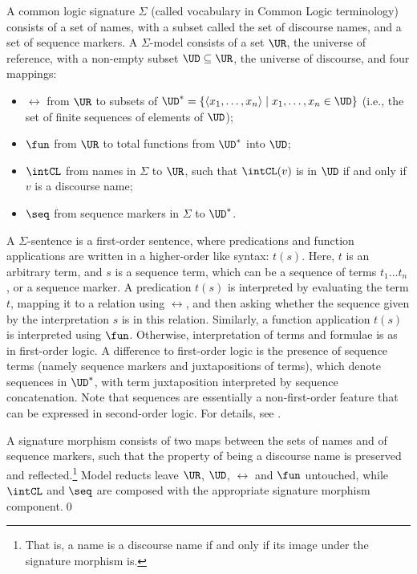 \documentclass[10pt,fleqn,final]{scrreprt}
\providecommand{\DIFaddbegin}{} %
\providecommand{\DIFaddend}{} %
\begin{document}
\begin{definition}\label{sem:CommonLogic}
A common logic signature
$\Sigma$ (called vocabulary in Common Logic terminology) consists of a
set of names, with a subset called the set of discourse names, and a
set of sequence markers.
A $\Sigma$-model consists of a set $\UR$,
the universe of reference, with a non-empty subset $\UD\subseteq \UR$,
the universe of discourse, and four mappings:
  \begin{itemize}
   \item $\rel$ from $\UR$ to subsets of $\UD^* = \{\langle x_1,\ldots,x_n \rangle \mid x_1,\ldots,x_n \in \UD\}$ (i.e., the set of finite sequences of
elements of $\UD$);
   \item $\fun$ from $\UR$ to total functions from $\UD^*$ into $\UD$;
   \item $\intCL$ from names in $\Sigma$ to $\UR$, such that
$\intCL(v)$ is in $\UD$ if and only if $v$ is a discourse name;
   \item $\seq$ from sequence markers in $\Sigma$ to $\UD^*$.
  \end{itemize}  A $\Sigma$-sentence is a first-order
sentence, where predications and function applications are written
in a higher-order like syntax: $t(s)$.
Here, $t$ is an arbitrary term, and $s$ is a sequence term, which can
be a sequence of terms $t_1\ldots t_n$, or a sequence marker.
A predication $t(s)$ is interpreted by evaluating the term $t$,
mapping it to a relation using $\rel$, and then asking whether the sequence
given by the interpretation $s$ is in this relation.  
Similarly, a function application $t(s)$ is interpreted using $\fun$.
Otherwise, interpretation of terms and formulae is as in
first-order logic. 
A 
difference to first-order logic is the presence of sequence terms (namely sequence markers and
juxtapositions of terms), which denote sequences in $\UD^*$, with term
juxtaposition interpreted by sequence concatenation.
Note that sequences are essentially a non-first-order feature that
can be expressed in second-order logic.
For details, see \cite{CommonLogic:oldfashioned}.

A \Clogic signature morphism 
consists of two maps between the sets of names and of sequence markers, such that the property of 
being a discourse name is preserved and reflected.\footnote{That  is, a name is a discourse
name if and only if its image under the signature morphism is.}
  Model reducts leave $\UR$, $\UD$, 
$\rel$ and $\fun$ untouched, while $\intCL$ and $\seq$ are composed with the appropriate
signature morphism component.\DIFaddbegin \quad\DIFaddend \qed
\end{definition}
%
\end{document}
